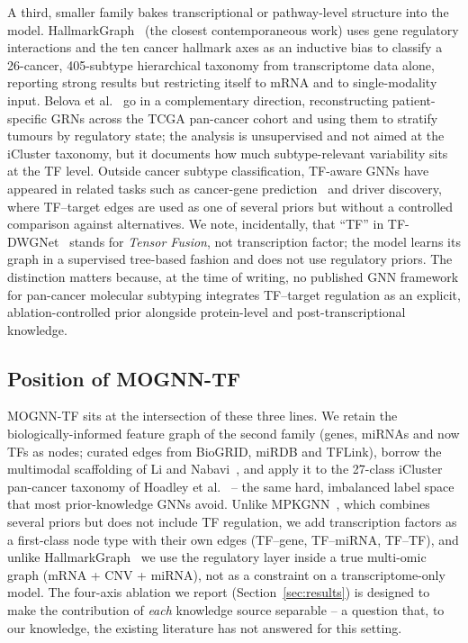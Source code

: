 \documentclass[review,3p,times,11pt, ]{elsarticle} %
\begin{document}
A third, smaller family bakes transcriptional or pathway-level structure
into the model. HallmarkGraph~\cite{zhang_hallmarkgraph_2025} (the closest
contemporaneous work) uses gene regulatory interactions and the ten cancer
hallmark axes as an inductive bias to classify a 26-cancer, 405-subtype
hierarchical taxonomy from transcriptome data alone, reporting strong
results but restricting itself to mRNA and to single-modality input.
Belova et al.~\cite{belova_pancancer_grn_2025} go in a complementary
direction, reconstructing patient-specific GRNs across the TCGA pan-cancer
cohort and using them to stratify tumours by regulatory state; the
analysis is unsupervised and not aimed at the iCluster taxonomy, but it
documents how much subtype-relevant variability sits at the TF level.
Outside cancer subtype classification, TF-aware GNNs have appeared in
related tasks such as cancer-gene prediction~\cite{xiao_graph_2023}
and driver discovery, where TF--target edges are used as one of several
priors but without a controlled comparison against alternatives. We note,
incidentally, that ``TF'' in
TF-DWGNet~\cite{yang_tfdwgnet_2026} stands for \emph{Tensor Fusion},
not transcription factor; the model learns its graph in a supervised
tree-based fashion and does not use regulatory priors. The distinction
matters because, at the time of writing, no published GNN framework for
pan-cancer molecular subtyping integrates TF--target regulation as an
explicit, ablation-controlled prior alongside protein-level and
post-transcriptional knowledge.

\subsection{Position of MOGNN-TF}
\label{ssec:rw_position}

MOGNN-TF sits at the intersection of these three lines. We retain the
biologically-informed feature graph of the second family (genes, miRNAs
and now TFs as nodes; curated edges from BioGRID, miRDB and TFLink),
borrow the multimodal scaffolding of Li and Nabavi~\cite{li_multimodal_2024},
and apply it to the 27-class iCluster pan-cancer taxonomy of
Hoadley et al.~\cite{Hoadley2018CellOfOriginPanCan} -- the same hard,
imbalanced label space that most prior-knowledge GNNs avoid. Unlike
MPKGNN~\cite{xiao_graph_2023}, which combines several priors but does not
include TF regulation, we add transcription factors as a first-class
node type with their own edges (TF--gene, TF--miRNA, TF--TF), and unlike
HallmarkGraph~\cite{zhang_hallmarkgraph_2025} we use the regulatory layer
inside a true multi-omic graph (mRNA + CNV + miRNA), not as a constraint
on a transcriptome-only model. The four-axis ablation we report
(Section~\ref{sec:results}) is designed to make the contribution of
\emph{each} knowledge source separable -- a question that, to our
knowledge, the existing literature has not answered for this setting.
\end{document}
